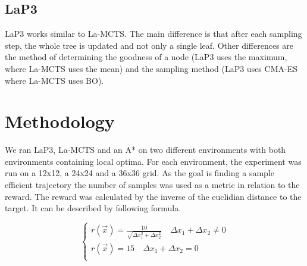 \documentclass[bibliography=totoc]{scrartcl}
\begin{document}
\subsection{LaP3}
\ac{LaP3} works similar to \ac{La-MCTS}. The main difference is that after each sampling step, the whole tree is updated and not only a single leaf. Other differences are the method of determining the goodness of a node (\ac{LaP3} uses the maximum, where \ac{La-MCTS} uses the mean) and the sampling method (\ac{LaP3} uses \ac{CMA-ES} where \ac{La-MCTS} uses \ac{BO}).

\section{Methodology}
We ran \ac{LaP3}, \ac{La-MCTS} and an A* on two different environments with both environments containing local optima. For each environment, the experiment was run on a 12x12, a 24x24 and a 36x36 grid. As the goal is finding a sample efficient trajectory the number of samples was used as a metric in relation to the reward. The reward was calculated by the inverse of the euclidian distance to the target. It can be described by following formula. 


\begin{equation}
\left\{
\begin{array}{lll}
 r(\vec{x})=\frac{10}{\sqrt{\Delta x_1 ^2+\Delta x_2 ^2}}\quad \Delta x_1 + \Delta x_2 \neq 0\\
r(\vec{x})=15\quad \Delta x_1 + \Delta x_2 =0\\
\end{array}
\right.
\end{equation}
\end{document}
